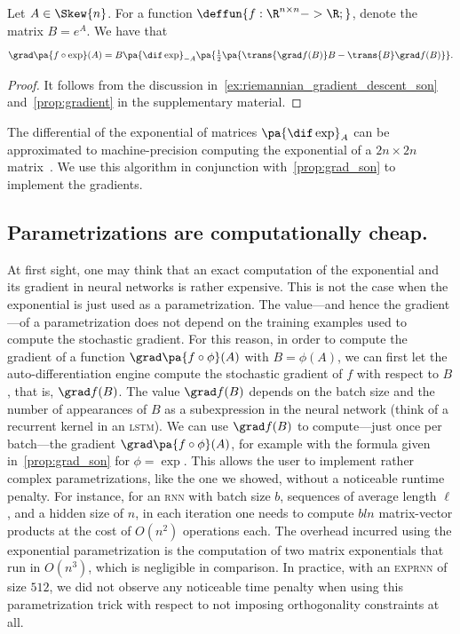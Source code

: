 \begin{proposition}\label{prop:grad_son}
    Let $A \in \Skew{n}$. For a function $\deffun{f : \R^{n \times n} -> \R;}$, denote the matrix $B = e^A$. We have that
    \[
        \grad\pa{f \circ \exp}(A) = B \pa{\dif \exp}_{-A}\pa{\tfrac{1}{2}\pa{\trans{\grad f(B)}B - \trans{B}\grad f(B)}}.
    \]
\end{proposition}

\begin{proof}
    It follows from the discussion in~\ref{ex:riemannian_gradient_descent_son} and~\ref{prop:gradient} in the supplementary material.
\end{proof}

The differential of the exponential of matrices $\pa{\dif \exp}_A$ can be approximated to machine-precision computing the exponential of a $2n \times 2n$ matrix~\cite{al2009computing}. We use this algorithm in conjunction with~\ref{prop:grad_son} to implement the gradients.

\subsection{Parametrizations are computationally cheap.}\label{sec:cheap}
At first sight, one may think that an exact computation of the exponential and its gradient in neural networks is rather expensive. This is not the case when the exponential is just used as a parametrization. The value---and hence the gradient---of a parametrization does not depend on the training examples used to compute the stochastic gradient. For this reason, in order to compute the gradient of a function $\grad\pa{f \circ \phi}(A)$ with $B = \phi(A)$, we can first let the auto-differentiation engine compute the stochastic gradient of $f$ with respect to $B$, that is, $\grad f(B)$. The value $\grad f(B)$ depends on the batch size and the number of appearances of $B$ as a subexpression in the neural network (think of a recurrent kernel in an \textsc{lstm}). We can use $\grad f(B)$ to compute---just once per batch---the gradient $\grad \pa{f \circ \phi}(A)$, for example with the formula given in~\ref{prop:grad_son} for $\phi = \exp$. This allows the user to implement rather complex parametrizations, like the one we showed, without a noticeable runtime penalty. For instance, for an \textsc{rnn} with batch size $b$, sequences of average length $\ell$, and a hidden size of $n$, in each iteration one needs to compute $bln$ matrix-vector products at the cost of $O(n^2)$ operations each. The overhead incurred using the exponential parametrization is the computation of two matrix exponentials that run in $O(n^3)$, which is negligible in comparison. In practice, with an \textsc{exprnn} of size $512$, we did not observe any noticeable time penalty when using this parametrization trick with respect to not imposing orthogonality constraints at all.

